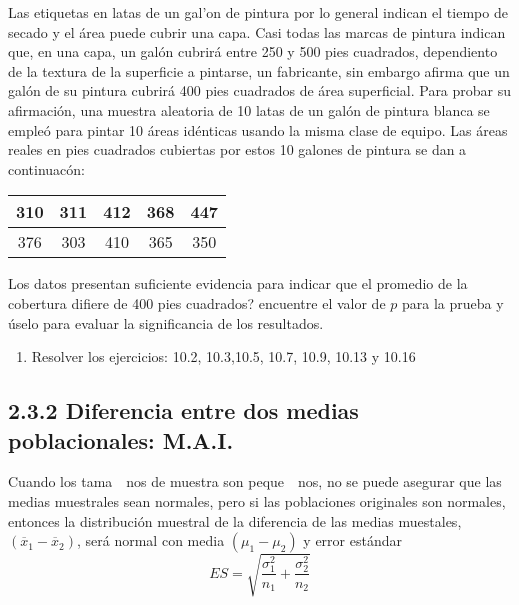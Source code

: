 \begin{frame}
\begin{frame}
\begin{Ejem}
Las etiquetas en latas de un gal'on de pintura por lo general indican el tiempo de secado y el \'area puede cubrir una capa. Casi todas las marcas de pintura indican que, en una capa, un gal\'on cubrir\'a entre 250 y 500 pies cuadrados, dependiento de la textura de la superficie a pintarse, un fabricante, sin embargo afirma que un gal\'on de su pintura cubrir\'a 400 pies cuadrados de \'area superficial. Para probar su afirmaci\'on, una muestra aleatoria de 10 latas de un gal\'on de pintura blanca se emple\'o para pintar 10 \'areas id\'enticas usando la misma clase de equipo. Las \'areas reales en pies cuadrados cubiertas por estos 10 galones de pintura se dan a continuac\'on:
\begin{center}
\begin{tabular}{|c|c|c|c|c|}
\hline 
310 & 311 & 412 & 368 & 447 \\ 
\hline 
376 & 303 &410 &365 & 350 \\ 
\hline 
\end{tabular} 
\end{center}
\end{Ejem}





\begin{Ejem}
Los datos presentan suficiente evidencia para indicar que el promedio de la cobertura difiere de 400 pies cuadrados? encuentre el valor de $p$ para la prueba y \'uselo para evaluar la significancia de los resultados.
\end{Ejem}
\begin{enumerate}
\item Resolver los ejercicios: 10.2, 10.3,10.5, 10.7, 10.9, 10.13 y 10.16
\end{enumerate}




\subsection{2.3.2 Diferencia entre dos medias poblacionales: M.A.I.}




\begin{Note}
Cuando los tama\ ~nos de muestra son peque\ ~nos, no se puede asegurar que las medias muestrales sean normales, pero si las poblaciones originales son normales, entonces la distribuci\'on muestral de la diferencia de las medias muestales, $\left(\overline{x}_{1}-\overline{x}_{2}\right)$, ser\'a normal con media $\left(\mu_{1}-\mu_{2}\right)$ y error est\'andar $$ES=\sqrt{\frac{\sigma_{1}^{2}}{n_{1}}+\frac{\sigma_{2}^{2}}{n_{2}}}$$


\end{Note}
\end{frame}
\end{frame}
